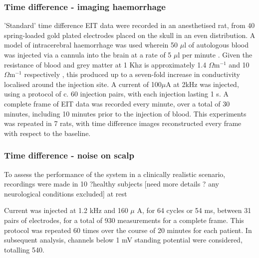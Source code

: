 \subsubsection{Time difference - imaging haemorrhage}
\label{methodsTD}
'Standard' time difference EIT data were recorded in an anesthetised rat, from 40 spring-loaded gold plated electrodes placed on the skull in an even distribution. A model of intracerebral haemorrhage was used wherein 50 $\mu$l of autologous blood was injected via a cannula into the brain at a rate of 5 $\mu$l per minute \cite{Dowrick_2016}. Given the resistance of blood and grey matter at 1 Khz is approximately 1.4 $\Omega {\text{m}}^{-1}$ and 10 $\Omega {\text{m}}^{-1}$ respectively \cite{Gabriel_2009}, this produced up to a seven-fold increase in conductivity localised around the injection site. A current of 100\( \mu \)A at 2kHz was injected, using a protocol of c. 60 injection pairs, with each injection lasting 1 s. A complete frame of EIT data was recorded every minute, over a total of 30 minutes, including 10 minutes prior to the injection of blood. This experiments was repeated in 7 rats, with time difference images reconstructed every frame with respect to the baseline.

\subsubsection{Time difference - noise on scalp}

To assess the performance of the system in a clinically realistic scenario, recordings were made in 10 ?healthy subjects [need more details ? any neurological conditions excluded] at rest 



Current was injected at 1.2 kHz and 160 $\mu$ A, for 64 cycles or 54 ms, between 31 pairs of electrodes, for a total of 930 measurements for a complete frame. This protocol was repeated 60 times over the course of 20 minutes for each patient. In subsequent analysis, channels below 1 mV standing potential were considered, totalling 540. 